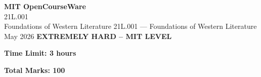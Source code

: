 \documentclass[12pt,a4paper]{exam}
\begin{document}
\begin{center}
{\LARGE \textbf{MIT OpenCourseWare}}\\21L.001\\Foundations of Western Literature
\vspace{0.5cm}
{21L.001} --- {Foundations of Western Literature}
\vspace{0.3cm}
May 2026
\vspace{0.3cm}
\textbf{EXTREMELY HARD -- MIT LEVEL}
\end{center}

\begin{center}
\textbf{Time Limit: 3 hours}
\end{center}

\begin{center}
\textbf{Total Marks: 100}
\end{center}

\vspace{0.5cm}
\end{document}
